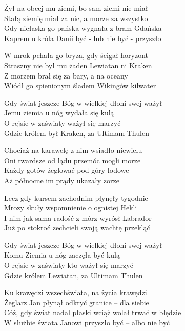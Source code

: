 \begin{text}
Żył na obcej mu ziemi, bo sam ziemi nie miał\\
Stałą ziemię miał za nic, a morze za wszystko\\
Gdy niełaska go pańska wygnała z bram Gdańska\\
Kaprem u króla Danii być - lub nie być - przyszło

W mrok pchała go bryza, gdy ścigał horyzont\\
Straszny nie był mu żaden Lewiatan ni Kraken\\
Z morzem brał się za bary, a na oceany\\
Wiódł go spienionym śladem Wikingów kilwater

Gdy świat jeszcze Bóg w wielkiej dłoni swej ważył\\
Jemu ziemia u nóg wydała się kulą\\
O rejsie w zaświaty ważył się marzyć\\
Gdzie królem był Kraken, za Ultimam Thulen

Chociaż na karawelę z nim wsiadło niewielu\\
Oni twardsze od lądu przemóc mogli morze\\
Każdy gotów żeglować pod góry lodowe\\
Aż północne im prądy ukazały zorze

Lecz gdy kursem zachodnim płynęły tygodnie\\
Mrozy skuły wspomnienie o ognistej Hekli\\
I nim jak sama radość z mórz wyrósł Labrador\\
Już po stokroć zechcieli swoją wachtę przekląć

Gdy świat jeszcze Bóg w wielkiej dłoni swej ważył\\
Komu Ziemia u nóg zaczęła być kulą\\
O rejsie w zaświaty kto ważył się marzyć\\
Gdzie królem Lewiatan, za Ultimam Thulen

Ku krawędzi wszechświata, na życia krawędzi\\
Żeglarz Jan płynął odkryć granice – dla siebie\\
Cóż, gdy świat nadal płaski wciąż wolał trwać w błędzie\\
W służbie świata Janowi przyszło być – albo nie być
\end{text}